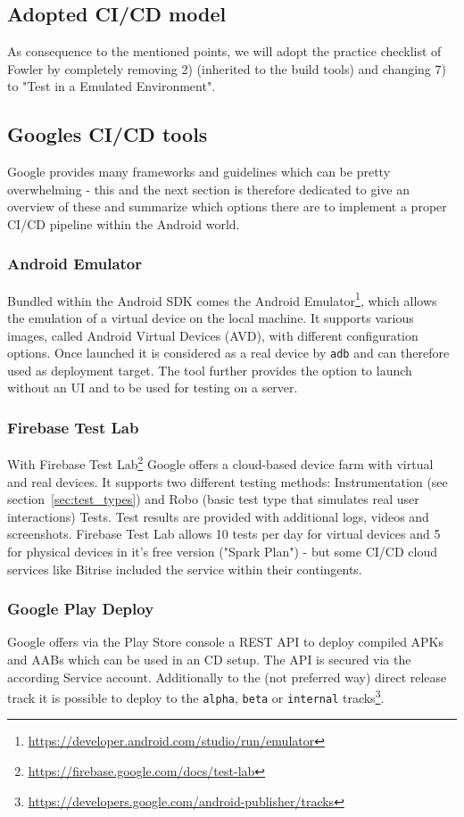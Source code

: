 \subsection{Adopted CI/CD model}
As consequence to the mentioned points, we will adopt the practice checklist of Fowler by completely removing 2) (inherited to the build tools) and changing 7) to "Test in a Emulated Environment".

\subsection{Googles CI/CD tools}

Google provides many frameworks and guidelines which can be pretty overwhelming - this and the next section is therefore dedicated to give an overview of these and summarize which options there are to implement a proper CI/CD pipeline within the Android world. 

\subsubsection{Android Emulator}

Bundled within the Android SDK comes the Android Emulator\footnote{\url{https://developer.android.com/studio/run/emulator}}, which allows the emulation of a virtual device on the local machine. It supports various images, called Android Virtual Devices (AVD), with different configuration options. Once launched it is considered as a real device by \texttt{adb} and can therefore used as deployment target. The tool further provides the option to launch without an UI and to be used for testing on a server.

\subsubsection{Firebase Test Lab}
With Firebase Test Lab\footnote{\url{https://firebase.google.com/docs/test-lab}} Google offers a cloud-based device farm with virtual and real devices. It supports two different testing methods: Instrumentation (see section~\ref{sec:test_types}) and Robo (basic test type that simulates real user interactions) Tests. Test results are provided with additional logs, videos and screenshots.
Firebase Test Lab allows 10 tests per day for virtual devices and 5 for physical devices in it's free version ("Spark Plan") - but some CI/CD cloud services like Bitrise included the service within their contingents.

\subsubsection{Google Play Deploy}
Google offers via the Play Store console a REST API to deploy compiled APKs and AABs which can be used in an CD setup. The API is secured via the according Service account. Additionally to the (not preferred way) direct release track it is possible to deploy to the \texttt{alpha}, \texttt{beta} or \texttt{internal} tracks\footnote{\url{https://developers.google.com/android-publisher/tracks}}.

